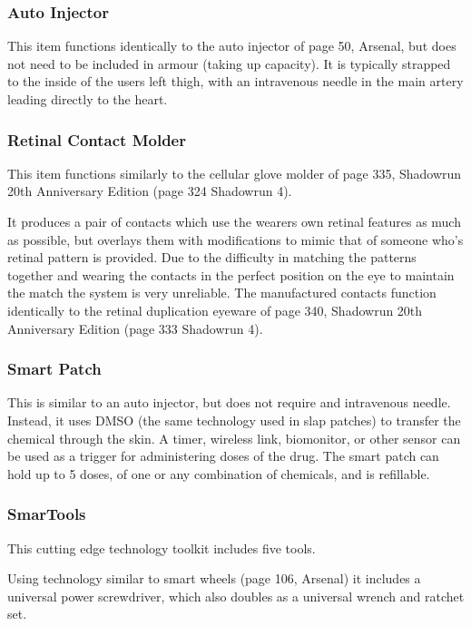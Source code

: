 \documentclass{article}
\begin{document}
\subsubsection*{Auto Injector}

This item functions identically to the auto injector of page 50, Arsenal, but does not need to be included in armour (taking up capacity).  It is typically strapped to the inside of the users left thigh, with an intravenous needle in the main artery leading directly to the heart.

\subsubsection*{Retinal Contact Molder}

This item functions similarly to the cellular glove molder of page 335, Shadowrun 20th Anniversary Edition (page 324 Shadowrun 4).  

  It produces a pair of contacts which use the wearers own retinal features as much as possible, but overlays them with modifications to mimic that of someone who's retinal pattern is provided.  Due to the difficulty in matching the patterns together and wearing the contacts in the perfect position on the eye to maintain the match the system is very unreliable.  The manufactured contacts function identically to the retinal duplication eyeware of page 340, Shadowrun 20th Anniversary Edition (page 333 Shadowrun 4).

\subsubsection*{Smart Patch}

  This is similar to an auto injector, but does not require and intravenous needle.  Instead, it uses DMSO (the same technology used in slap patches) to transfer the chemical through the skin.  A timer, wireless link, biomonitor, or other sensor can be used as a trigger for administering doses of the drug.  The smart patch can hold up to 5 doses, of one or any combination of chemicals, and is refillable.

\subsubsection*{SmarTools}

  This cutting edge technology toolkit includes five tools.

  Using technology similar to smart wheels (page 106, Arsenal) it includes a universal power screwdriver, which also doubles as a universal wrench and ratchet set.
  
\end{document}
